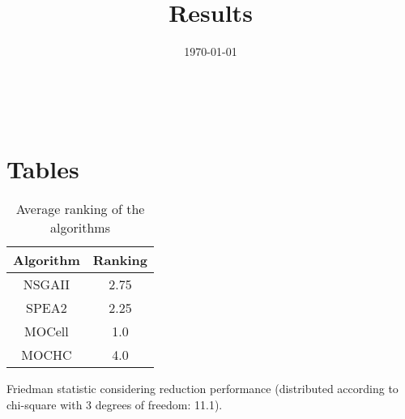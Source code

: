 \documentclass{article}
\title{Results}
\author{}
\date{\today}
\begin{document}
\oddsidemargin 0in \topmargin 0in\maketitle
\
\section{Tables}
\begin{table}[!htp]
\centering
\caption{Average ranking of the algorithms}
\begin{tabular}{c|c}
Algorithm&Ranking\\
\hline
NSGAII&2.75\\
SPEA2&2.25\\
MOCell&1.0\\
MOCHC&4.0\\
\end{tabular}
\end{table}


Friedman statistic considering reduction performance (distributed according to chi-square with 3 degrees of freedom: 11.1).
\end{document}
